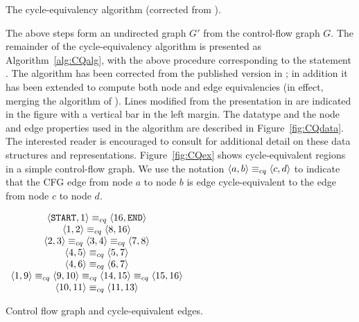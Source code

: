 \documentclass[12pt,titlepage,twoside]{article}
\begin{document}
\begin{myalgorithm}\small\linespread{0.75}
\caption{The cycle-equivalency algorithm
	 (corrected from \cite{johnson93:sese}).}
\label{alg:CQalg}\end{myalgorithm}

The above steps form an undirected graph $G'$ from the control-flow
graph $G$.  The remainder of the cycle-equivalency algorithm is
presented as Algorithm~\vref{alg:CQalg}, with the above procedure
corresponding to the statement .  The
algorithm has been corrected from the published version in
\cite{johnson93:sese}; in addition it has been extended to compute
both node and edge equivalencies (in effect, merging the algorithm of
\cite{johnson94:pst}).  Lines modified from the presentation in
\cite{johnson93:sese} are indicated in the figure with a vertical bar
in the left margin.  The datatype  and the node
and edge properties used in the algorithm are described in
Figure~\vref{fig:CQdata}.  The interested reader is encouraged to consult
\cite{johnson93:sese} for additional detail on these data structures
and representations.%
Figure~\vref{fig:CQex} shows cycle-equivalent regions in a simple
control-flow graph.  We use the notation
$\left\langle a,b \right\rangle\equiv_{cq}\left\langle c,d \right\rangle$ to indicate that the CFG edge from node
$a$ to node $b$ is edge cycle-equivalent to the edge from node $c$ to
node $d$.

\begin{myfigure}\centering
\vertcenter{}
$\begin{array}[c]{cc}
\left\langle \texttt{START},1 \right\rangle\equiv_{cq}\left\langle 16,\texttt{END} \right\rangle\\
\left\langle 1,2 \right\rangle\equiv_{cq}\left\langle 8,16 \right\rangle\\
\left\langle 2,3 \right\rangle\equiv_{cq}\left\langle 3,4 \right\rangle\equiv_{cq}\left\langle 7,8 \right\rangle\\
\left\langle 4,5 \right\rangle\equiv_{cq}\left\langle 5,7 \right\rangle\\
\left\langle 4,6 \right\rangle\equiv_{cq}\left\langle 6,7 \right\rangle\\
\left\langle 1,9 \right\rangle\equiv_{cq}\left\langle 9,10 \right\rangle\equiv_{cq}\left\langle 14,15 \right\rangle\equiv_{cq}\left\langle 15,16 \right\rangle\\
\left\langle 10,11 \right\rangle\equiv_{cq}\left\langle 11,13 \right\rangle\\
\end{array}$
\caption{Control flow graph and cycle-equivalent edges.}
\label{fig:CQex}\end{myfigure}
\end{document}
